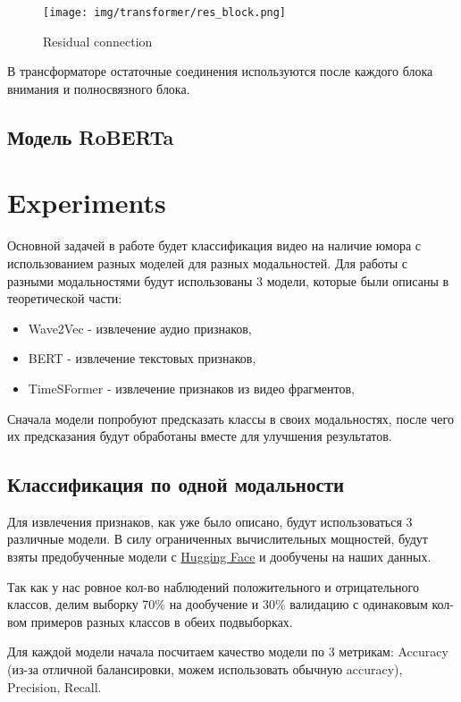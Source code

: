 \documentclass[PMI,VKR]{HSEUniversity}
\begin{document}
\begin{figure}[h]
    \centering
    \texttt{[image: img/transformer/res\_block.png]}
    \caption{Residual connection}
\end{figure}

В трансформаторе остаточные соединения используются после каждого блока внимания и полносвязного блока.

\newpage

\section{Модель RoBERTa}




\newpage
\chapter{Experiments}

Основной задачей в работе будет классификация видео на наличие юмора с использованием разных моделей для разных модальностей.
Для работы с разными модальностями будут использованы 3 модели, которые были описаны в теоретической части:
\begin{itemize}
    \item Wave2Vec - извлечение аудио признаков,
    \item BERT - извлечение текстовых признаков,
    \item TimeSFormer - извлечение признаков из видео фрагментов,
\end{itemize}

Сначала модели попробуют предсказать классы в своих модальностях, после чего их предсказания будут обработаны вместе для улучшения результатов.

\section{Классификация по одной модальности}

Для извлечения признаков, как уже было описано, будут использоваться 3 различные модели. В силу ограниченных вычислительных мощностей, будут взяты предобученные модели с \href{https://huggingface.co/}{Hugging Face} и дообучены на наших данных.

Так как у нас ровное кол-во наблюдений положительного и отрицательного классов, делим выборку 70\% на дообучение и 30\% валидацию с одинаковым кол-вом примеров разных классов в обеих подвыборках.

Для каждой модели начала посчитаем качество модели по 3 метрикам: Accuracy (из-за отличной балансировки, можем использовать обычную accuracy), Precision, Recall.
\end{document}
